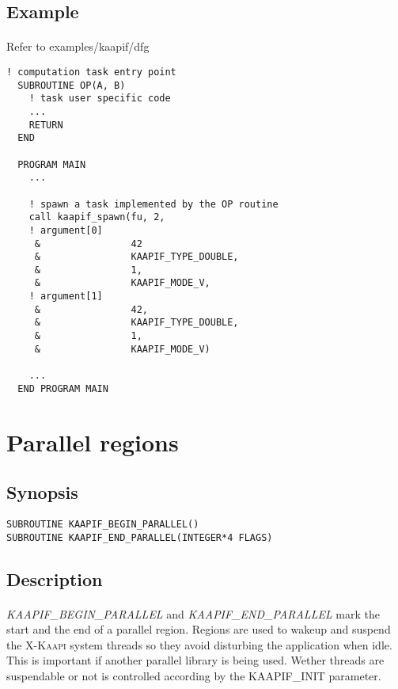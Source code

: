 \documentclass[a4paper, 11pt]{article}
\newcommand{\kaapi}{\textsc{X-Kaapi}\xspace}
\begin{document}
\subsection{Example}
\paragraph{}
Refer to examples/kaapif/dfg

\begin{small}
\begin{lstlisting}[frame=tb]
  ! computation task entry point
  SUBROUTINE OP(A, B)
    ! task user specific code
    ...
    RETURN
  END

  PROGRAM MAIN
    ...

    ! spawn a task implemented by the OP routine
    call kaapif_spawn(fu, 2,
    ! argument[0]
     &                42
     &                KAAPIF_TYPE_DOUBLE,
     &                1,
     &                KAAPIF_MODE_V,
    ! argument[1]
     &                42,
     &                KAAPIF_TYPE_DOUBLE,
     &                1,
     &                KAAPIF_MODE_V)

    ...
  END PROGRAM MAIN
\end{lstlisting}
\end{small}


\newpage
\section{Parallel regions}

\subsection{Synopsis}
\begin{small}
\lstset{language=C}
\begin{lstlisting}[frame=tb]
SUBROUTINE KAAPIF_BEGIN_PARALLEL()
SUBROUTINE KAAPIF_END_PARALLEL(INTEGER*4 FLAGS)
\end{lstlisting}
\end{small}

\subsection{Description}
\paragraph{}
\textit{KAAPIF\_BEGIN\_PARALLEL} and \textit{KAAPIF\_END\_PARALLEL} mark the
start and the end of a parallel region. Regions are used to wakeup and suspend
the \kaapi system threads so they avoid disturbing the application when idle.
This is important if another parallel library is being used. Wether threads
are suspendable or not is controlled according by the KAAPIF\_INIT parameter.
\end{document}
